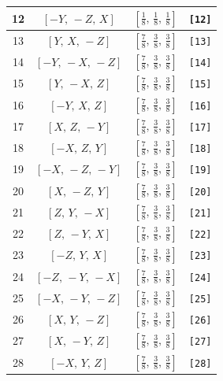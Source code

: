 \documentclass[fleqn,8pt]{jsarticle}
\begin{document}
\begin{longtable}{cccc}
12 & $\left[ - Y,\, - Z,\, X \right]$ & $\left[ \frac{1}{8},\, \frac{1}{8},\, \frac{1}{8} \right]$ & {\tt [12]} \\ \hline
13 & $\left[ Y,\, X,\, - Z \right]$ & $\left[ \frac{7}{8},\, \frac{3}{8},\, \frac{3}{8} \right]$ & {\tt [13]} \\ \hline
14 & $\left[ - Y,\, - X,\, - Z \right]$ & $\left[ \frac{7}{8},\, \frac{3}{8},\, \frac{3}{8} \right]$ & {\tt [14]} \\ \hline
15 & $\left[ Y,\, - X,\, Z \right]$ & $\left[ \frac{7}{8},\, \frac{3}{8},\, \frac{3}{8} \right]$ & {\tt [15]} \\ \hline
16 & $\left[ - Y,\, X,\, Z \right]$ & $\left[ \frac{7}{8},\, \frac{3}{8},\, \frac{3}{8} \right]$ & {\tt [16]} \\ \hline
17 & $\left[ X,\, Z,\, - Y \right]$ & $\left[ \frac{7}{8},\, \frac{3}{8},\, \frac{3}{8} \right]$ & {\tt [17]} \\ \hline
18 & $\left[ - X,\, Z,\, Y \right]$ & $\left[ \frac{7}{8},\, \frac{3}{8},\, \frac{3}{8} \right]$ & {\tt [18]} \\ \hline
19 & $\left[ - X,\, - Z,\, - Y \right]$ & $\left[ \frac{7}{8},\, \frac{3}{8},\, \frac{3}{8} \right]$ & {\tt [19]} \\ \hline
20 & $\left[ X,\, - Z,\, Y \right]$ & $\left[ \frac{7}{8},\, \frac{3}{8},\, \frac{3}{8} \right]$ & {\tt [20]} \\ \hline
21 & $\left[ Z,\, Y,\, - X \right]$ & $\left[ \frac{7}{8},\, \frac{3}{8},\, \frac{3}{8} \right]$ & {\tt [21]} \\ \hline
22 & $\left[ Z,\, - Y,\, X \right]$ & $\left[ \frac{7}{8},\, \frac{3}{8},\, \frac{3}{8} \right]$ & {\tt [22]} \\ \hline
23 & $\left[ - Z,\, Y,\, X \right]$ & $\left[ \frac{7}{8},\, \frac{3}{8},\, \frac{3}{8} \right]$ & {\tt [23]} \\ \hline
24 & $\left[ - Z,\, - Y,\, - X \right]$ & $\left[ \frac{7}{8},\, \frac{3}{8},\, \frac{3}{8} \right]$ & {\tt [24]} \\ \hline
25 & $\left[ - X,\, - Y,\, - Z \right]$ & $\left[ \frac{7}{8},\, \frac{3}{8},\, \frac{3}{8} \right]$ & {\tt [25]} \\ \hline
26 & $\left[ X,\, Y,\, - Z \right]$ & $\left[ \frac{7}{8},\, \frac{3}{8},\, \frac{3}{8} \right]$ & {\tt [26]} \\ \hline
27 & $\left[ X,\, - Y,\, Z \right]$ & $\left[ \frac{7}{8},\, \frac{3}{8},\, \frac{3}{8} \right]$ & {\tt [27]} \\ \hline
28 & $\left[ - X,\, Y,\, Z \right]$ & $\left[ \frac{7}{8},\, \frac{3}{8},\, \frac{3}{8} \right]$ & {\tt [28]} \\ \hline

\end{longtable}
\end{document}
